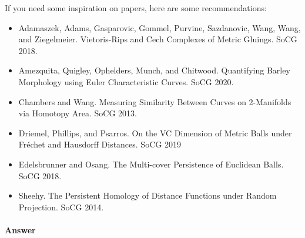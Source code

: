 \documentclass{article}
\begin{document}
If you need some inspiration on papers, here are some recommendations:
\begin{itemize}
    \item  Adamaszek, Adams,  Gasparovic, Gommel, Purvine, Sazdanovic,
        Wang, Wang, and Ziegelmeier. Vietoris-Rips and Cech Complexes of Metric
        Gluings. SoCG 2018.
    \item Amezquita, Quigley, Ophelders, Munch, and Chitwood.
        Quantifying Barley Morphology using Euler Characteristic Curves. SoCG
        2020.
    \item Chambers and Wang. Measuring Similarity Between Curves on 2-Manifolds
        via Homotopy Area. SoCG 2013.
    \item Driemel, Phillips, and Psarros.
        On the VC Dimension of Metric Balls under Fr\'echet and Hausdorff
        Distances. SoCG 2019
    \item Edelsbrunner and Osang. The Multi-cover Persistence of Euclidean
        Balls. SoCG 2018.
    \item Sheehy. The Persistent Homology of Distance Functions under Random
        Projection. SoCG 2014.
\end{itemize}

\paragraph{Answer}
\end{document}
